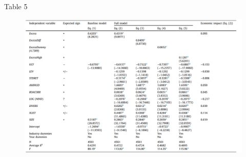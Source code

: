 \documentclass{beamer}
\begin{document}
\begin{frame}
			\begin{table}[htbp]
	\centering
	\resizebox{0.75\textheight}{!}{
		
		\label{tab:synchronicityt4}	
	}
\end{table}
\end{frame}

\begin{frame}{Table 5}
	\begin{figure}
		\centering
		\includegraphics[width=0.9\linewidth]{t5}
		\label{fig:t5}
	\end{figure}
\end{frame}
\begin{frame}
	\begin{table}[htbp]
		\centering
		\resizebox{0.75\textheight}{!}{
			
			\label{tab:synchronicityt5}	
		}
	\end{table}
\end{frame}
\end{document}
